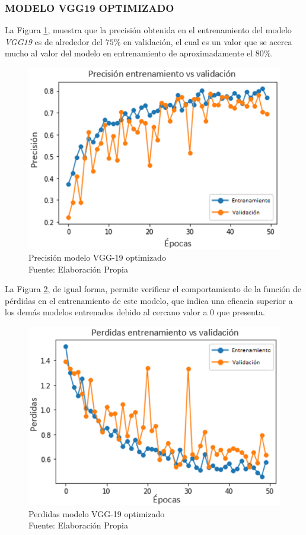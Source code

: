 \subsubsection{\MakeUppercase{Modelo  VGG19 optimizado}}

La Figura \ref{fig:preci_vgg19_OPT}, muestra que la precisión obtenida en el entrenamiento del modelo \textit{VGG19} es de alrededor del $75 \%$ en validación, el cual es un valor que se acerca mucho al valor del modelo en entrenamiento de aproximadamente el $80 \%$.

\begin{figure}[ht]
	\centering
	\includegraphics[scale=0.7]{Figs/504.png}
	\caption{Precisión modelo VGG-19 optimizado\\ Fuente: Elaboración Propia}
	\label{fig:preci_vgg19_OPT}
\end{figure}

\newpage
La Figura \ref{fig:perdda_vgg19_opt}, de igual forma, permite verificar el comportamiento de la función de pérdidas en el entrenamiento de este modelo, que indica una eficacia superior a los demás modelos entrenados debido al cercano valor a $0$ que presenta. 

\begin{figure}[ht]
	\centering
	\includegraphics[scale=0.7]{Figs/505.png}
	\caption{Perdidas modelo VGG-19 optimizado \\ Fuente: Elaboración Propia}
	\label{fig:perdda_vgg19_opt}
\end{figure}

